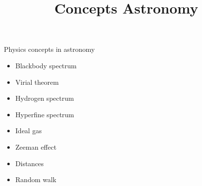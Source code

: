 \documentclass{../template/texnote}
\title{Concepts Astronomy}
\begin{document}
    \maketitle {}
Physics concepts in astronomy
\begin{itemize}
\item  Blackbody spectrum
\item  Virial theorem
\item  Hydrogen spectrum
\item  Hyperfine spectrum
\item  Ideal gas
\item  Zeeman effect
\item  Distances
\item  Random walk
\end{itemize}
    \printbibliography
\end{document}
